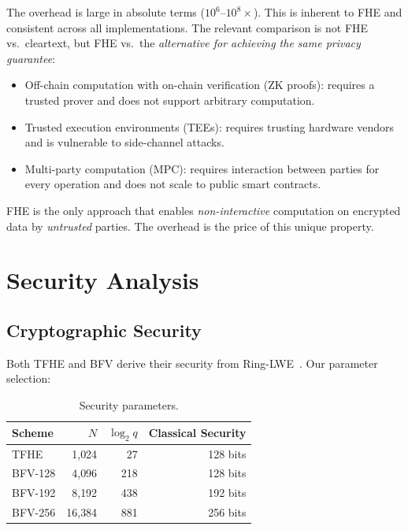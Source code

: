 \documentclass[11pt,a4paper]{article}
\begin{document}
The overhead is large in absolute terms ($10^6$--$10^8\times$). This is inherent to
FHE and consistent across all implementations. The relevant comparison is not FHE
vs.\ cleartext, but FHE vs.\ the \emph{alternative for achieving the same privacy
guarantee}:

\begin{itemize}[leftmargin=2em]
  \item Off-chain computation with on-chain verification (ZK proofs): requires a
        trusted prover and does not support arbitrary computation.
  \item Trusted execution environments (TEEs): requires trusting hardware vendors
        and is vulnerable to side-channel attacks.
  \item Multi-party computation (MPC): requires interaction between parties for
        every operation and does not scale to public smart contracts.
\end{itemize}

FHE is the only approach that enables \emph{non-interactive} computation on encrypted
data by \emph{untrusted} parties. The overhead is the price of this unique property.

\section{Security Analysis}
\label{sec:security}

\subsection{Cryptographic Security}

Both TFHE and BFV derive their security from Ring-LWE~\cite{lyubashevsky2010ideal}.
Our parameter selection:

\begin{table}[ht]
\centering
\caption{Security parameters.}
\label{tab:security-params}
\begin{tabular}{lrrr}
\toprule
\textbf{Scheme} & \textbf{$N$} & \textbf{$\log_2 q$} & \textbf{Classical Security} \\
\midrule
TFHE & 1{,}024 & 27 & 128 bits \\
BFV-128 & 4{,}096 & 218 & 128 bits \\
BFV-192 & 8{,}192 & 438 & 192 bits \\
BFV-256 & 16{,}384 & 881 & 256 bits \\
\bottomrule
\end{tabular}
\end{table}
\end{document}
